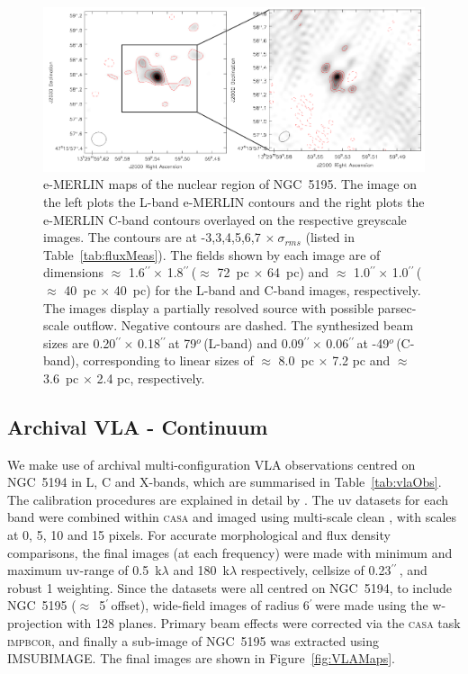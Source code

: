 \documentclass[fleqn,usenatbib]{mnras}
\def\fig{Figure}
\def\tab{Table}
\def\Tab{Table}
\def\deg{$^{o}\,$}
\def\arcm{$^{\prime}\,$}
\def\arcs{$^{\prime\prime}\,$}
\begin{document}
\begin{figure}
\centering
\includegraphics[scale=0.5,clip=true,trim=0cm 0.1cm 0cm 0cm]{fig1.png}
\caption{e-MERLIN maps of the nuclear region of NGC~5195. The image on the left plots the L-band e-MERLIN contours and the right plots the e-MERLIN C-band contours overlayed on the respective greyscale images. The contours are at -3,3,4,5,6,7 $\times~\sigma_{rms}$ (listed in \tab~\ref{tab:fluxMeas}). The fields shown by each image are of dimensions $\approx$ 1.6\arcs $\times$ 1.8\arcs ($\approx$ 72~pc $\times$ 64~pc) and $\approx$ 1.0\arcs $\times$ 1.0\arcs ($\approx$ 40~pc $\times$ 40~pc) for the L-band and C-band images, respectively. The images display a partially resolved source with possible parsec-scale outflow. Negative contours are dashed. The synthesized beam sizes are 0.20\arcs $\times$ 0.18\arcs at 79\deg (L-band) and  0.09\arcs $\times$ 0.06\arcs at -49\deg (C-band), corresponding to linear sizes of $\approx$ 8.0~pc $\times$ 7.2 pc and $\approx$ 3.6~pc $\times$ 2.4 pc, respectively.} 
\label{fig:MERLINimg}
\end{figure}



\subsection{Archival VLA - Continuum} 
\label{sec:vla_cont}
We make use of archival multi-configuration VLA observations centred on NGC~5194 in L, C and X-bands, which 
are summarised in \Tab~\ref{tab:vlaObs}. The calibration procedures are explained in detail by 
\cite{Dumasetal2011}. { The  uv datasets 
for each band were combined within \textsc{casa} 
and imaged using multi-scale clean \citep{RC2011}, with scales at 0, 5, 10 and 15 pixels. }For 
accurate morphological and flux density comparisons, the final images (at each frequency) were made 
with minimum and maximum uv-range of 0.5~k$\lambda$ and 180~k$\lambda$ respectively, cellsize of 
0.23\arcs, and robust 1 weighting. Since the datasets were all centred on NGC~5194, to include 
NGC~5195 ($\approx$~5\arcm offset), wide-field images of radius 6\arcm were made {using the 
w-projection \citep{wproj} with 128 planes}.  Primary beam effects were {corrected via} the 
\textsc{casa} task \textsc{impbcor}, and finally a sub-image of NGC~5195 was extracted using 
IMSUBIMAGE. The final images are shown in \fig~\ref{fig:VLAMaps}.
\end{document}
